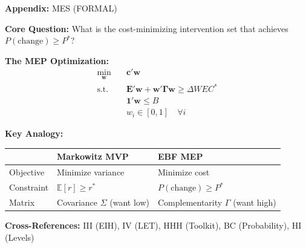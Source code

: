 
\begin{tcolorbox}[colback=blue!5!white, colframe=blue!75!black,
    title=Quick Reference: Minimum Effective Portfolio]
\textbf{Appendix:} MES (FORMAL)


\textbf{Core Question:} What is the cost-minimizing intervention set that achieves
$P(\text{change}) \geq P^*$?

\textbf{The MEP Optimization:}
\begin{equation}
\boxed{
\begin{aligned}
\min_{\mathbf{w}} \quad & \mathbf{c}'\mathbf{w} \\
\text{s.t.} \quad & \mathbf{E}'\mathbf{w} + \mathbf{w}'\boldsymbol{\Gamma}\mathbf{w} \geq \Delta WEC^* \\
& \mathbf{1}'\mathbf{w} \leq B \\
& w_i \in [0, 1] \quad \forall i
\end{aligned}
}
\label{eq:mep-optimization}
\end{equation}

\textbf{Key Analogy:}
\begin{center}
\begin{tabular}{@{}lll@{}}
\toprule
& \textbf{Markowitz MVP} & \textbf{EBF MEP} \\
\midrule
Objective & Minimize variance & Minimize cost \\
Constraint & $\mathbb{E}[r] \geq r^*$ & $P(\text{change}) \geq P^*$ \\
Matrix & Covariance $\Sigma$ (want low) & Complementarity $\Gamma$ (want high) \\
\bottomrule
\end{tabular}
\end{center}

\textbf{Cross-References:} III (EIH), IV (LET), HHH (Toolkit), BC (Probability), HI (Levels)
\end{tcolorbox}


